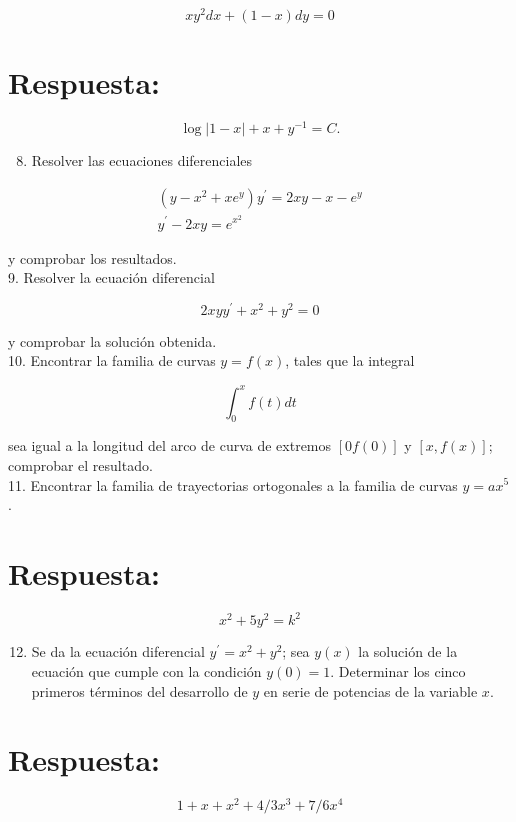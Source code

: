 \documentclass[10pt]{article}
\theoremstyle{plain}
\theoremstyle{definition}
\theoremstyle{remark}
\begin{document}
$$
x y^{2} d x+(1-x) d y=0
$$

\section*{Respuesta:}
$$
\log |1-x|+x+y^{-1}=C .
$$

\begin{enumerate}
  \setcounter{enumi}{7}
  \item Resolver las ecuaciones diferenciales
\end{enumerate}

$$
\begin{gathered}
\left(y-x^{2}+x e^{y}\right) y^{\prime}=2 x y-x-e^{y} \\
y^{\prime}-2 x y=e^{x^{2}}
\end{gathered}
$$

y comprobar los resultados.\\
9. Resolver la ecuación diferencial

$$
2 x y y^{\prime}+x^{2}+y^{2}=0
$$

y comprobar la solución obtenida.\\
10. Encontrar la familia de curvas $y=f(x)$, tales que la integral

$$
\int_{0}^{x} f(t) d t
$$

sea igual a la longitud del arco de curva de extremos $[0 f(0)]$ y $[x, f(x)]$; comprobar el resultado.\\
11. Encontrar la familia de trayectorias ortogonales a la familia de curvas $y=a x^{5}$.

\section*{Respuesta:}
$$
x^{2}+5 y^{2}=k^{2}
$$

\begin{enumerate}
  \setcounter{enumi}{11}
  \item Se da la ecuación diferencial $y^{\prime}=x^{2}+y^{2}$; sea $y(x)$ la solución de la ecuación que cumple con la condición $y(0)=1$. Determinar los cinco primeros términos del desarrollo de $y$ en serie de potencias de la variable $x$.
\end{enumerate}

\section*{Respuesta:}
$$
1+x+x^{2}+4 / 3 x^{3}+7 / 6 x^{4}
$$
\end{document}
